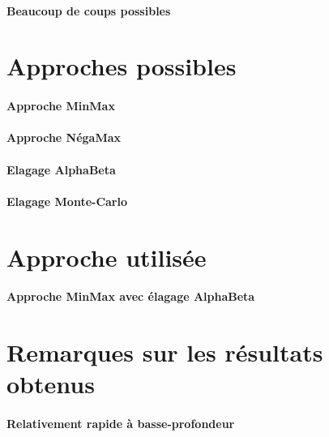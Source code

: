 \documentclass{scrreprt}
\begin{document}
    \paragraph{Beaucoup de coups possibles}

    \begin{problem}

    \end{problem}

    \section{Approches possibles}

    \paragraph{Approche MinMax}

    \paragraph{Approche NégaMax}

    \paragraph{Elagage AlphaBeta}

    \paragraph{Elagage Monte-Carlo}

    \section{Approche utilisée}

    \paragraph{Approche MinMax avec élagage AlphaBeta}

    \begin{result}

    \end{result}

    \section{Remarques sur les résultats obtenus}

    \paragraph{Relativement rapide à basse-profondeur}
\end{document}
